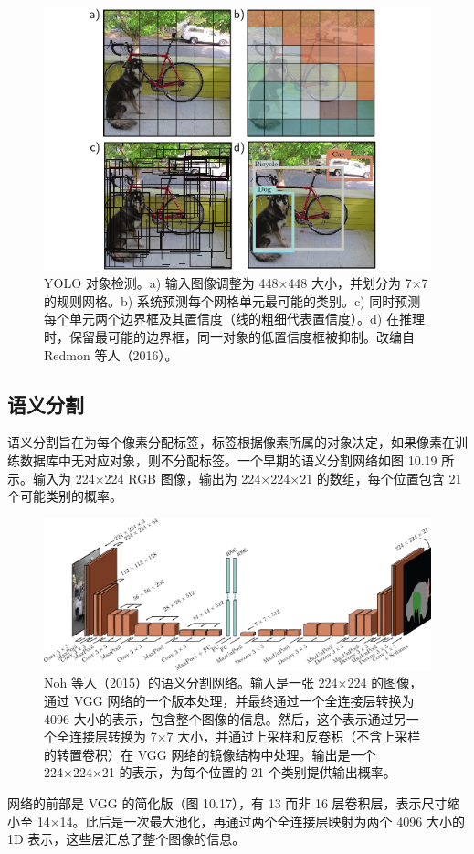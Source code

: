 \begin{figure}[ht!]
	\centering
	\includegraphics[width=0.7\linewidth]{png/chapter10/ConvYOLO.png}
	\caption{YOLO 对象检测。a) 输入图像调整为 448×448 大小，并划分为 7×7 的规则网格。b) 系统预测每个网格单元最可能的类别。c) 同时预测每个单元两个边界框及其置信度（线的粗细代表置信度）。d) 在推理时，保留最可能的边界框，同一对象的低置信度框被抑制。改编自 Redmon 等人（2016）。}
\end{figure}


\subsection{语义分割}
语义分割旨在为每个像素分配标签，标签根据像素所属的对象决定，如果像素在训练数据库中无对应对象，则不分配标签。一个早期的语义分割网络如图 10.19 所示。输入为 224×224 RGB 图像，输出为 224×224×21 的数组，每个位置包含 21 个可能类别的概率。

\begin{figure}[ht!]
	\centering
	\includegraphics[width=0.7\linewidth]{png/chapter10/ConvSemSeg.png}
	\caption{Noh 等人（2015）的语义分割网络。输入是一张 224×224 的图像，通过 VGG 网络的一个版本处理，并最终通过一个全连接层转换为 4096 大小的表示，包含整个图像的信息。然后，这个表示通过另一个全连接层转换为 7×7 大小，并通过上采样和反卷积（不含上采样的转置卷积）在 VGG 网络的镜像结构中处理。输出是一个 224×224×21 的表示，为每个位置的 21 个类别提供输出概率。}
\end{figure}

网络的前部是 VGG 的简化版（图 10.17），有 13 而非 16 层卷积层，表示尺寸缩小至 14×14。此后是一次最大池化，再通过两个全连接层映射为两个 4096 大小的 1D 表示，这些层汇总了整个图像的信息。

